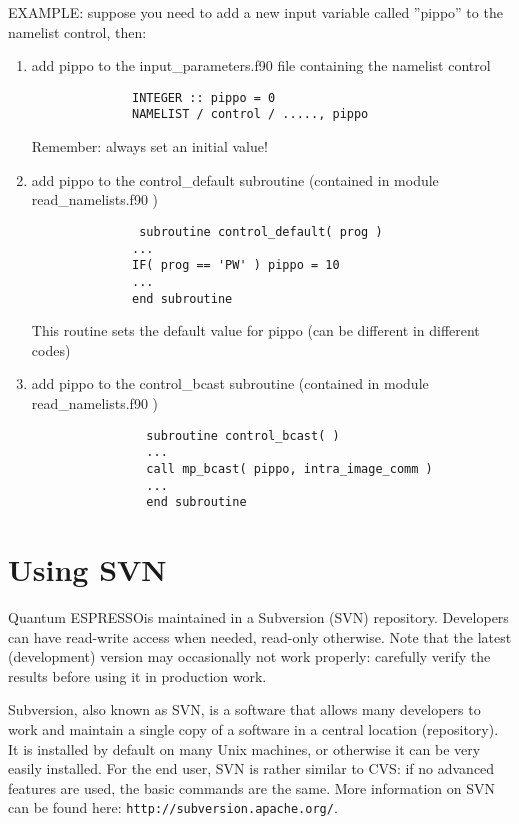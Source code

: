 \documentclass[12pt,a4paper]{article}
\def\qe{{\sc Quantum ESPRESSO}}
\begin{document}
EXAMPLE:
suppose you need to add a new input variable called ''pippo''
to the namelist control, then:

\begin{enumerate}
\item add pippo to the input\_parameters.f90 file containing the
namelist control
\begin{verbatim}
              INTEGER :: pippo = 0
              NAMELIST / control / ....., pippo
\end{verbatim}
Remember: always set an initial value!

\item add pippo to the control\_default subroutine (contained in
module read\_namelists.f90 )
\begin{verbatim}
               subroutine control_default( prog )
              ...
              IF( prog == 'PW' ) pippo = 10
              ...
              end subroutine
\end{verbatim}
This routine sets the default value for pippo (can be different in
different codes)

\item add pippo to the control\_bcast subroutine (contained in module
read\_namelists.f90 )
 \begin{verbatim}
                subroutine control_bcast( )
                ...
                call mp_bcast( pippo, intra_image_comm )
                ...
                end subroutine
\end{verbatim}
\end{enumerate}

\section{Using SVN}
\label{Sec:SVN}
\qe is maintained in a Subversion (SVN) repository. Developers can have
read-write access when needed, read-only otherwise. Note that the latest
(development) version may occasionally not work properly: carefully
verify the results before using it in production work.

Subversion, also known as SVN, is a software that allows many
developers to work and maintain a single copy of a software in a
central location (repository).
It is installed by default on many Unix machines, or otherwise
it can be very easily installed.
For the end user, SVN is rather similar to CVS:
if no advanced features are used, the basic commands are the same.
More information on SVN can be found here:
\texttt{http://subversion.apache.org/}.
\end{document}
